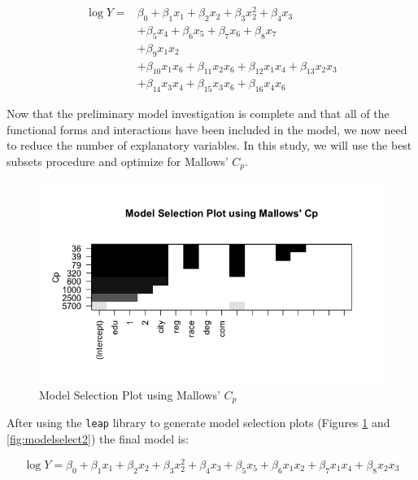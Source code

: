 \documentclass{article}
\begin{document}
      \begin{align*}
        \log{Y} = &\beta_0 + \beta_1 x_1 + \beta_2 x_2 + \beta_3 x_2^2 + \beta_4 x_3 \\
                    &+ \beta_5 x_4 + \beta_6 x_5 + \beta_7 x_6 + \beta_8 x_7 \\
                    &+ \beta_9 x_1 x_2 \\
                    &+ \beta_{10} x_1 x_6 + \beta_{11} x_2 x_6 + \beta_{12} x_1 x_4 + \beta_{13} x_2 x_3 \\
                    &+ \beta_{14} x_3 x_4 + \beta_{15} x_3 x_6 + \beta_{16} x_4 x_6
      \end{align*}

      Now that the preliminary model investigation is complete and that all of the
      functional forms and interactions have been included in the model, we now
      need to reduce the number of explanatory variables. In this study, we will
      use the best subsets procedure and optimize for Mallows' $C_p$.

      \begin{figure}
        \centering
        \includegraphics[scale=0.5]{selection/modelselect1}
        \caption{Model Selection Plot using Mallows' $C_p$}
        \label{fig:modelselect1}
      \end{figure}

      After using the \texttt{leap} library to generate model selection plots
      (Figures \ref{fig:modelselect1} and \ref{fig:modelselect2}) the final model is:

      \begin{equation}
        \log{Y} = \beta_0 + \beta_1 x_1 + \beta_2 x_2 + \beta_3 x_2^2 + \beta_4 x_3 + \beta_5 x_5 + \beta_6 x_1 x_2 + \beta_7 x_1 x_4 + \beta_8 x_2 x_3
      \end{equation}
\end{document}
